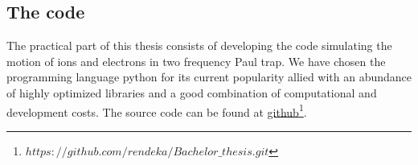 \subsection{The code}
The practical part of this thesis consists of developing the code simulating the motion of ions and electrons in two frequency Paul trap. We have chosen the programming language python for its current popularity allied with an abundance of highly optimized libraries and a good combination of computational and development costs. The source code  can be found at \href{https://github.com/rendeka/Bachelor_thesis.git}{github\footnote{$https://github.com/rendeka/Bachelor\_thesis.git$}.}  